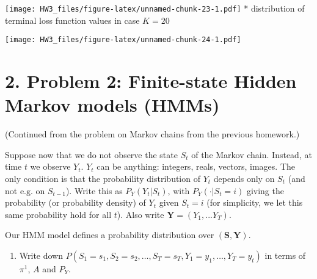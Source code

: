 \documentclass[]{article}
\newenvironment{Shaded}{\begin{snugshade}}{\end{snugshade}}
\newcommand{\KeywordTok}[1]{\textcolor[rgb]{0.13,0.29,0.53}{\textbf{#1}}}
\newcommand{\DataTypeTok}[1]{\textcolor[rgb]{0.13,0.29,0.53}{#1}}
\newcommand{\DecValTok}[1]{\textcolor[rgb]{0.00,0.00,0.81}{#1}}
\newcommand{\StringTok}[1]{\textcolor[rgb]{0.31,0.60,0.02}{#1}}
\newcommand{\OperatorTok}[1]{\textcolor[rgb]{0.81,0.36,0.00}{\textbf{#1}}}
\newcommand{\NormalTok}[1]{#1}
\providecommand{\tightlist}{%
  \setlength{\itemsep}{0pt}\setlength{\parskip}{0pt}}
\begin{document}
\texttt{[image: HW3\_files/figure-latex/unnamed-chunk-23-1.pdf]} *
distribution of terminal loss function values in case \(K = 20\)

\begin{Shaded}
\end{Shaded}

\texttt{[image: HW3\_files/figure-latex/unnamed-chunk-24-1.pdf]}

\section{2. Problem 2: Finite-state Hidden Markov models
(HMMs)}\label{problem-2-finite-state-hidden-markov-models-hmms}

(Continued from the problem on Markov chains from the previous
homework.)

Suppose now that we do not observe the state \(S_t\) of the Markov
chain. Instead, at time \(t\) we observe \(Y_t\). \(Y_t\) can be
anything: integers, reals, vectors, images. The only condition is that
the probability distribution of \(Y_t\) depends only on \(S_t\) (and not
\(\text{e.g.}\) on \(S_{t-1}\)). Write this as \(P_Y (Y_t|S_t)\), with
\(P_Y (\cdot |S_t = i)\) giving the probability (or probability density)
of \(Y_t\) given \(S_t = i\) (for simplicity, we let this same
probability hold for all \(t\)). Also write
\(\mathbf{Y} = (Y_1, . . . Y_T )\).

Our HMM model defines a probability distribution over
\((\mathbf{S}, \mathbf{Y})\).

\begin{enumerate}
\def\labelenumi{\arabic{enumi}.}
\tightlist
\item
  Write down
  \(P(S_1 = s_1, S_2 = s_2, \dots, S_T = s_T , Y_1 = y_1, \dots, Y_T = y_t)\)
  in terms of \(\pi^1\), \(A\) and \(P_Y\).
\end{enumerate}
\end{document}
